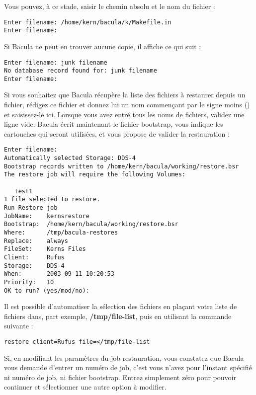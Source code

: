 Vous pouvez, \`a ce stade, saisir le chemin absolu et le nom du fichier :

\footnotesize
\begin{verbatim}
Enter filename: /home/kern/bacula/k/Makefile.in
Enter filename:
\end{verbatim}
\normalsize

Si Bacula ne peut en trouver aucune copie, il affiche ce qui suit :

\footnotesize
\begin{verbatim}
Enter filename: junk filename
No database record found for: junk filename
Enter filename:
\end{verbatim}
\normalsize

Si vous souhaitez que Bacula r\'ecup\`ere la liste des fichiers \`a restaurer depuis 
un fichier, r\'edigez ce fichier et donnez lui un nom commen\c{c}ant par le signe 
moins (\lt{}) et saisissez-le ici. Lorsque vous avez entr\'e tous les noms de 
fichiers, validez une ligne vide. Bacula \'ecrit maintenant le fichier 
bootstrap, vous indique les cartouches qui seront utilis\'ees, et vous propose 
de valider la restauration :

\footnotesize
\begin{verbatim}
Enter filename:
Automatically selected Storage: DDS-4
Bootstrap records written to /home/kern/bacula/working/restore.bsr
The restore job will require the following Volumes:
   
   test1
1 file selected to restore.
Run Restore job
JobName:    kernsrestore
Bootstrap:  /home/kern/bacula/working/restore.bsr
Where:      /tmp/bacula-restores
Replace:    always
FileSet:    Kerns Files
Client:     Rufus
Storage:    DDS-4
When:       2003-09-11 10:20:53
Priority:   10
OK to run? (yes/mod/no):
\end{verbatim}
\normalsize

Il est possible d'automatiser la s\'election des fichiers en pla\c{c}ant votre liste 
de fichiers dans, part exemple, {\bf /tmp/file-list}, puis en utilisant la 
commande suivante :

\footnotesize
\begin{verbatim}
restore client=Rufus file=</tmp/file-list
\end{verbatim}
\normalsize

Si, en modifiant les param\`etres du job restauration, vous constatez que Bacula 
vous demande d'entrer un num\'ero de job, c'est vous n'avez pour l'instant sp\'ecifi\'e 
ni num\'ero de job, ni fichier bootstrap. Entrez simplement z\'ero pour pouvoir 
continuer et s\'electionner une autre option \`a modifier.

